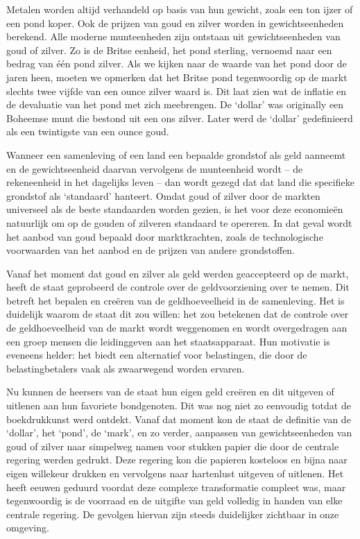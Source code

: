 \documentclass[
  a5paper,
  smalldemyvopaper,10pt,twoside,onecolumn,openright,extrafontsizes,hidelinks]{memoir}
\begin{document}
Metalen worden altijd verhandeld op basis van hun gewicht, zoals een ton
ijzer of een pond koper. Ook de prijzen van goud en zilver worden in
gewichtseenheden berekend. Alle moderne munteenheden zijn ontstaan uit
gewichtseenheden van goud of zilver. Zo is de Britse eenheid, het pond
sterling, vernoemd naar een bedrag van één pond zilver. Als we kijken
naar de waarde van het pond door de jaren heen, moeten we opmerken dat
het Britse pond tegenwoordig op de markt slechts twee vijfde van een
ounce zilver waard is. Dit laat zien wat de inflatie en de devaluatie
van het pond met zich meebrengen. De `dollar' was originally een
Boheemse munt die bestond uit een ons zilver. Later werd de `dollar'
gedefinieerd als een twintigste van een ounce goud.

Wanneer een samenleving of een land een bepaalde grondstof als geld
aanneemt en de gewichtseenheid daarvan vervolgens de munteenheid wordt
-- de rekeneenheid in het dagelijks leven -- dan wordt gezegd dat dat
land die specifieke grondstof als `standaard' hanteert. Omdat goud of
zilver door de markten universeel als de beste standaarden worden
gezien, is het voor deze economieën natuurlijk om op de gouden of
zilveren standaard te opereren. In dat geval wordt het aanbod van goud
bepaald door marktkrachten, zoals de technologische voorwaarden van het
aanbod en de prijzen van andere grondstoffen.

Vanaf het moment dat goud en zilver als geld werden geaccepteerd op de
markt, heeft de staat geprobeerd de controle over de geldvoorziening
over te nemen. Dit betreft het bepalen en creëren van de geldhoeveelheid
in de samenleving. Het is duidelijk waarom de staat dit zou willen: het
zou betekenen dat de controle over de geldhoeveelheid van de markt wordt
weggenomen en wordt overgedragen aan een groep mensen die leidinggeven
aan het staatsapparaat. Hun motivatie is eveneens helder: het biedt een
alternatief voor belastingen, die door de belastingbetalers vaak als
zwaarwegend worden ervaren.

Nu kunnen de heersers van de staat hun eigen geld creëren en dit
uitgeven of uitlenen aan hun favoriete bondgenoten. Dit was nog niet zo
eenvoudig totdat de boekdrukkunst werd ontdekt. Vanaf dat moment kon de
staat de definitie van de `dollar', het `pond', de `mark', en zo verder,
aanpassen van gewichtseenheden van goud of zilver naar simpelweg namen
voor stukken papier die door de centrale regering werden gedrukt. Deze
regering kon die papieren kosteloos en bijna naar eigen willekeur
drukken en vervolgens naar hartenlust uitgeven of uitlenen. Het heeft
eeuwen geduurd voordat deze complexe transformatie compleet was, maar
tegenwoordig is de voorraad en de uitgifte van geld volledig in handen
van elke centrale regering. De gevolgen hiervan zijn steeds duidelijker
zichtbaar in onze omgeving.
\end{document}
